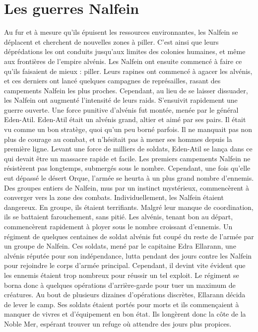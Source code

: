 \section{Les guerres Nalfein}
Au fur et à mesure qu'ils épuisent les ressources environnantes, les Nalfein se déplacent et cherchent de nouvelles zones à piller. C'est ainsi que leurs déprédations les ont conduits jusqu'aux limites des colonies humaines, et même aux frontières de l'empire alvénis. Les Nalfein ont ensuite commencé à faire ce qu'ils faisaient de mieux : piller. Leurs rapines ont commencé à agacer les alvénis, et ces derniers ont lancé quelques campagnes de représailles, rasant des campements Nalfein les plus proches. Cependant, au lieu de se laisser dissuader, les Nalfein ont augmenté l'intensité de leurs raids. S'ensuivit rapidement une guerre ouverte. Une force punitive d'alvénis fut montée, menée par le général Eden-Atil. 
\newline
Eden-Atil était un alvénis grand, altier et aimé par ses pairs. Il était vu comme un bon stratège, quoi qu'un peu borné parfois. Il ne manquait pas non plus de courage au combat, et n'hésitait pas à mener ses hommes depuis la première ligne. Levant une force de milliers de soldats, Eden-Atil se lança dans ce qui devait être un massacre rapide et facile. Les premiers campements Nalfein ne résistèrent pas longtemps, submergés sous le nombre. Cependant, une fois qu'elle eut dépassé le désert Orque, l'armée se heurta à un plus grand nombre d'ennemis. Des groupes entiers de Nalfein, mus par un instinct mystérieux, commencèrent à converger vers la zone des combats. Individuellement, les Nalfein étaient dangereux. En groupe, ils étaient terrifiants. Malgré leur manque de coordination, ils se battaient farouchement, sans pitié. Les alvénis, tenant bon au départ, commencèrent rapidement à ployer sous le nombre croissant d'ennemis. Un régiment de quelques centaines de soldat alvénis fut coupé du reste de l'armée par un groupe de Nalfein. Ces soldats, mené par le capitaine Edra Ellarann, une alvénis réputée pour son indépendance, lutta pendant des jours contre les Nalfein pour rejoindre le corps d'armée principal. Cependant, il devint vite évident que les ennemis étaient trop nombreux pour réussir un tel exploit. Le régiment se borna donc à quelques opérations d'arrière-garde pour tuer un maximum de créatures. Au bout de plusieurs dizaines d'opérations discrètes, Ellarann décida de lever le camp. Ses soldats étaient portés pour morts et ils commençaient à manquer de vivres et d'équipement en bon état. Ils longèrent donc la côte de la Noble Mer, espérant trouver un refuge où attendre des jours plus propices.
